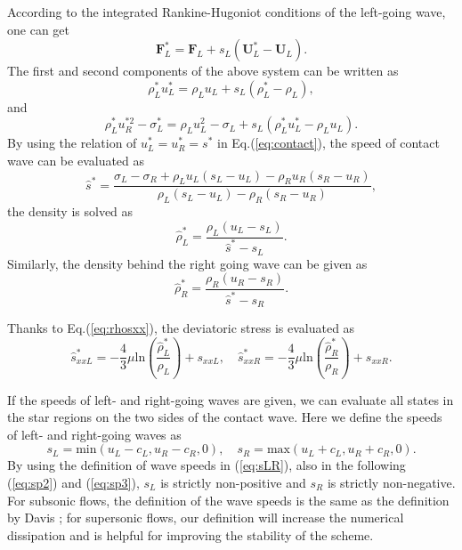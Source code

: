 \documentclass[review]{elsarticle}
\begin{document}
According to the integrated  Rankine-Hugoniot conditions of  the  left-going  wave, one can get
\begin{equation} \label{eq:RH1}
    \mathbf{F}_L^* = \mathbf{F}_L+s_L (\mathbf{U}_L^*-\mathbf{U}_L).
\end{equation}
The first and second components of the above system can be written as
\begin{equation} \label{eq:rhoLstar}
  \rho_L^* u_L^*=\rho_L u_L+s_L(\rho_L^*-\rho_L),
\end{equation}
and
\begin{equation}\label{eq:sigma}
  \rho_L^* u_R^{*2}-\sigma^*_L=\rho_L u_L^2-\sigma_L+s_L(\rho_L^* u_L^*-\rho_L u_L).
\end{equation}
By using the relation of $u_L^* =u_R^* = s^*$ in Eq.(\ref{eq:contact}), the speed of contact wave can be evaluated as
\begin{equation}
 \hat{s}^* = \frac{\sigma_L-\sigma_R+\rho_L u_L(s_L-u_L)-\rho_R u_R(s_R-u_R)}{\rho_L(s_L-u_L)-\rho_R(s_R-u_R)},
\end{equation}
the density is solved as
\begin{equation}\label{eq:rhoLs}
  \hat{\rho}_L^* = \frac{\rho_L(u_L-s_L)}{\hat{s}^*-s_L}.
\end{equation}
Similarly, the density behind the right going wave can be given as
\begin{equation}\label{eq:rhoLs}
  \hat{\rho}_R^* = \frac{\rho_R(u_R-s_R)}{\hat{s}^*-s_R}.
\end{equation}

Thanks to Eq.(\ref{eq:rhosxx}),  the deviatoric stress is evaluated as
\begin{equation}  \label{sxx1}
  \hat{s}_{xxL}^*=-\frac{4}{3}\mu\text{ln}(\frac{\hat{\rho}_L^*}{\rho_L})+s_{xxL}, \quad   \hat{s}_{xxR}^*=-\frac{4}{3}\mu\text{ln}(\frac{\hat{\rho}_R^*}{\rho_R})+s_{xxR}.
\end{equation}

If the speeds of left- and right-going waves are given, we can evaluate all states in the star regions on the two sides of  the contact wave. Here we define the speeds of left- and right-going waves as
    \begin{equation}\label{eq:sLR}
      s_L = \text{min} (u_L-c_L, u_R-c_R, 0),  \quad s_R = \text{max}(u_L+c_L, u_R+c_R, 0).
    \end{equation}
By using the definition of wave speeds in (\ref{eq:sLR}), also in the following (\ref{eq:sp2}) and (\ref{eq:sp3}), $s_L$ is strictly non-positive and $s_R$ is strictly non-negative. For subsonic flows, the definition of the wave speeds is the same as the definition by  Davis \cite{davis1988simplified}; for supersonic flows, our definition will increase the numerical dissipation and is helpful for improving the stability of the scheme. 
\end{document}
